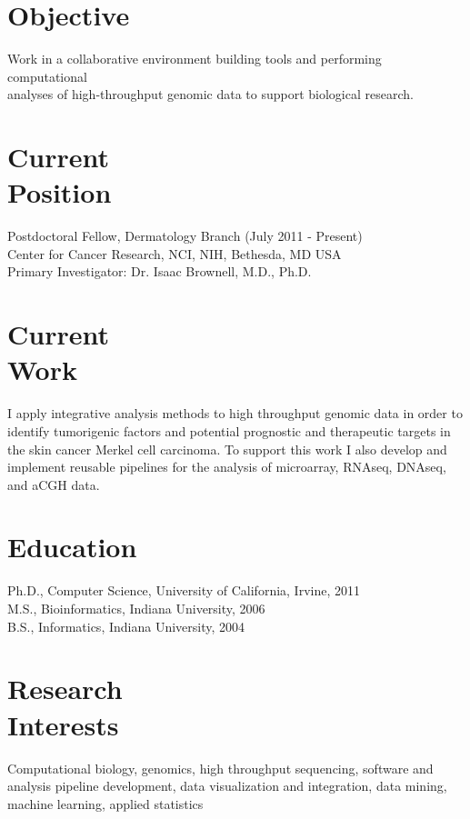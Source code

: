 \documentclass[margin,line]{res}
\begin{document}
\address{\textbf{E-mail:} kenny@kennydaily.net \textbf{Web:} www.kennydaily.net}
\address{10301 Grosvenor Place Apt 703, North Bethesda, MD 20852}

\begin{resume}


\section{\sc Objective}
Work in a collaborative environment building tools and performing computational\\
analyses of high-throughput genomic data to support biological research.

\section{\sc Current\\Position}
Postdoctoral Fellow, Dermatology Branch  (July 2011 - Present)\\
Center for Cancer Research, NCI, NIH, Bethesda, MD USA \\
Primary Investigator: Dr. Isaac Brownell, M.D., Ph.D.

\section{\sc Current\\Work}
I apply integrative analysis methods to high throughput genomic data in order to identify tumorigenic factors and potential prognostic and therapeutic targets in the skin cancer Merkel cell carcinoma.
To support this work I also develop and implement reusable pipelines for the analysis of microarray, RNAseq, DNAseq, and aCGH data.

\section{\sc Education}
Ph.D., Computer Science, University of California, Irvine, 2011\\%
M.S., Bioinformatics, Indiana University, 2006\\%
B.S., Informatics, Indiana University, 2004%

\section{\sc Research\\Interests}
Computational biology, genomics, high throughput sequencing, software and analysis pipeline development, data visualization and integration, data mining, machine learning, applied statistics


\end{resume}
\end{document}
